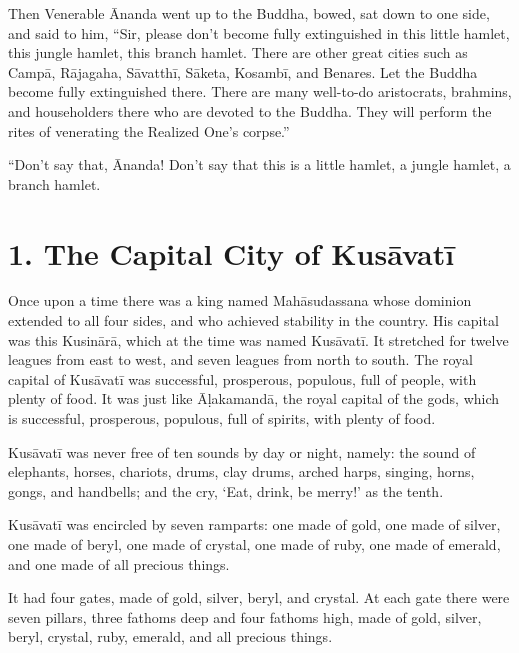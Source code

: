 \documentclass[12pt,openany]{book}%
\begin{document}
Then Venerable Ānanda went up to the Buddha, bowed, sat down to one side, and said to him, “Sir, please don’t become fully extinguished in this little hamlet, this jungle hamlet, this branch hamlet. There are other great cities such as \textsanskrit{Campā}, \textsanskrit{Rājagaha}, \textsanskrit{Sāvatthī}, \textsanskrit{Sāketa}, \textsanskrit{Kosambī}, and Benares. Let the Buddha become fully extinguished there. There are many well-to-do aristocrats, brahmins, and householders there who are devoted to the Buddha. They will perform the rites of venerating the Realized One’s corpse.” 

“Don’t say that, Ānanda! Don’t say that this is a little hamlet, a jungle hamlet, a branch hamlet. 

\section*{1. The Capital City of \textsanskrit{Kusāvatī} }

Once upon a time there was a king named \textsanskrit{Mahāsudassana} whose dominion extended to all four sides, and who achieved stability in the country. His capital was this \textsanskrit{Kusinārā}, which at the time was named \textsanskrit{Kusāvatī}. It stretched for twelve leagues from east to west, and seven leagues from north to south. The royal capital of \textsanskrit{Kusāvatī} was successful, prosperous, populous, full of people, with plenty of food. It was just like \textsanskrit{Āḷakamandā}, the royal capital of the gods, which is successful, prosperous, populous, full of spirits, with plenty of food. 

\textsanskrit{Kusāvatī} was never free of ten sounds by day or night, namely: the sound of elephants, horses, chariots, drums, clay drums, arched harps, singing, horns, gongs, and handbells; and the cry, ‘Eat, drink, be merry!’ as the tenth. 

\textsanskrit{Kusāvatī} was encircled by seven ramparts: one made of gold, one made of silver, one made of beryl, one made of crystal, one made of ruby, one made of emerald, and one made of all precious things. 

It had four gates, made of gold, silver, beryl, and crystal. At each gate there were seven pillars, three fathoms deep and four fathoms high, made of gold, silver, beryl, crystal, ruby, emerald, and all precious things. 
\end{document}
